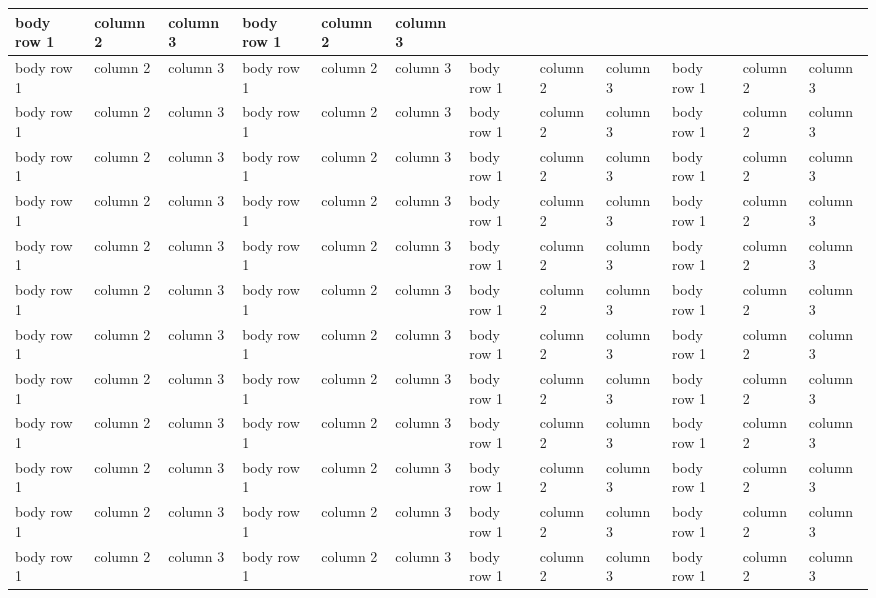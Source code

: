 \documentclass[a4paper,11pt,french]{rtdsphinxmanual}
\begin{document}
\begin{longtable}{|l|l|l|l|l|l|l|l|l|l|l|l|}
body row 1
 & 
column 2
 & 
column 3
 & 
body row 1
 & 
column 2
 & 
column 3
\\
\hline
body row 1
 & 
column 2
 & 
column 3
 & 
body row 1
 & 
column 2
 & 
column 3
 & 
body row 1
 & 
column 2
 & 
column 3
 & 
body row 1
 & 
column 2
 & 
column 3
\\
\hline
body row 1
 & 
column 2
 & 
column 3
 & 
body row 1
 & 
column 2
 & 
column 3
 & 
body row 1
 & 
column 2
 & 
column 3
 & 
body row 1
 & 
column 2
 & 
column 3
\\
\hline
body row 1
 & 
column 2
 & 
column 3
 & 
body row 1
 & 
column 2
 & 
column 3
 & 
body row 1
 & 
column 2
 & 
column 3
 & 
body row 1
 & 
column 2
 & 
column 3
\\
\hline
body row 1
 & 
column 2
 & 
column 3
 & 
body row 1
 & 
column 2
 & 
column 3
 & 
body row 1
 & 
column 2
 & 
column 3
 & 
body row 1
 & 
column 2
 & 
column 3
\\
\hline
body row 1
 & 
column 2
 & 
column 3
 & 
body row 1
 & 
column 2
 & 
column 3
 & 
body row 1
 & 
column 2
 & 
column 3
 & 
body row 1
 & 
column 2
 & 
column 3
\\
\hline
body row 1
 & 
column 2
 & 
column 3
 & 
body row 1
 & 
column 2
 & 
column 3
 & 
body row 1
 & 
column 2
 & 
column 3
 & 
body row 1
 & 
column 2
 & 
column 3
\\
\hline
body row 1
 & 
column 2
 & 
column 3
 & 
body row 1
 & 
column 2
 & 
column 3
 & 
body row 1
 & 
column 2
 & 
column 3
 & 
body row 1
 & 
column 2
 & 
column 3
\\
\hline
body row 1
 & 
column 2
 & 
column 3
 & 
body row 1
 & 
column 2
 & 
column 3
 & 
body row 1
 & 
column 2
 & 
column 3
 & 
body row 1
 & 
column 2
 & 
column 3
\\
\hline
body row 1
 & 
column 2
 & 
column 3
 & 
body row 1
 & 
column 2
 & 
column 3
 & 
body row 1
 & 
column 2
 & 
column 3
 & 
body row 1
 & 
column 2
 & 
column 3
\\
\hline
body row 1
 & 
column 2
 & 
column 3
 & 
body row 1
 & 
column 2
 & 
column 3
 & 
body row 1
 & 
column 2
 & 
column 3
 & 
body row 1
 & 
column 2
 & 
column 3
\\
\hline
body row 1
 & 
column 2
 & 
column 3
 & 
body row 1
 & 
column 2
 & 
column 3
 & 
body row 1
 & 
column 2
 & 
column 3
 & 
body row 1
 & 
column 2
 & 
column 3
\\
\hline
body row 1
 & 
column 2
 & 
column 3
 & 
body row 1
 & 
column 2
 & 
column 3
 & 
body row 1
 & 
column 2
 & 
column 3
 & 
body row 1
 & 
column 2
 & 
column 3
\\

\end{longtable}
\end{document}
